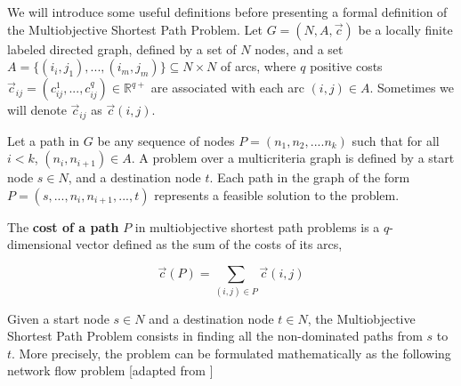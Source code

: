 We will introduce some useful definitions before presenting a formal definition of the Multiobjective Shortest Path Problem. Let $G =(N,A,\vec c)$ be a locally finite labeled directed graph, defined by a set of $N$ nodes, and a set $A = \{ (i_i,j_1),...,(i_m,j_m) \} \subseteq N \times N$ of arcs, where $q$ positive costs $\vec c_{ij} = (c^1_{ij},..., c^q_{ij}) \in \mathbb{R}^{q+}$ are associated with each arc $(i,j) \in A$. Sometimes we will denote $\vec c_{ij}$ as $\vec c(i,j)$.

Let a path in $G$ be any sequence of nodes $P = (n_1, n_2,....n_k)$ such that for all $i < k$, $(n_i, n_{i+1}) \in A$. A problem over a multicriteria graph is defined by a start node $s \in N$, and a destination node $t$. Each path in the graph of the form $P = (s,..., n_i,n_{i+1},...,t)$ represents a feasible solution to the problem. 

\begin{defi}\label{chapMultiObjAlg:def:multiObjcostpath}
The \textbf{cost of a path} $P$ in multiobjective shortest path problems is a $q$-dimensional vector defined as the sum of the costs of its arcs,

\begin{equation}\label{chapMultiObjAlg:eq:multiObjaddCostPath}
    \vec c(P) = \sum_{(i,j) \in P}{\vec c(i,j)} 
\end{equation}
\end{defi}

\begin{defi}\label{chapMultiObjAlg:def:multiObjsolution}
Given a start node $s \in N$ and a destination node $t \in N$, the Multiobjective Shortest Path Problem consists in finding all the non-dominated paths from $s$ to $t$. More precisely, the problem can be formulated mathematically as the following network flow problem [adapted from \cite{Raith2009a}]
\end{defi}

